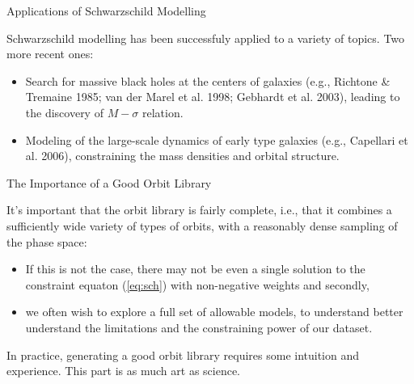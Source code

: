 \documentclass[letterpaper,landscape]{slides}
\begin{document}
\begin{slide}
\begin{center}
{\large \color{red} 
                  Applications of Schwarzschild Modelling   }
\end{center}

Schwarzschild modelling has been successfuly applied to a variety of topics.
Two more recent ones:
\begin{itemize}
\item Search for massive black holes at the centers of galaxies 
(e.g., Richtone \& Tremaine 1985; van der Marel et al. 1998;
Gebhardt et al. 2003), leading to the discovery of $M-\sigma$ relation.
\item Modeling of the large-scale dynamics of early type galaxies
(e.g., Capellari et al. 2006), constraining the mass densities and orbital
structure.
\end{itemize}

\vfill
\end{slide}

\begin{slide}
\begin{center}
{\large \color{red} 
                  The Importance of a Good Orbit Library  }
\end{center}

It's important that the orbit library is fairly complete, i.e., that it
combines a sufficiently wide variety of types of orbits, with a reasonably
dense sampling of the phase space:

\begin{itemize}
\item If this is not the case, there may not be even a single solution to
the constraint equaton (\ref{eq:sch}) with non-negative weights and secondly,
\item we often wish to explore a full set of allowable models, to understand
better understand the limitations and the constraining power of our dataset.
\end{itemize}

In practice, generating a good orbit library requires some intuition and
experience. This part is as much art as science.

\vfill
\end{slide}
\end{document}
